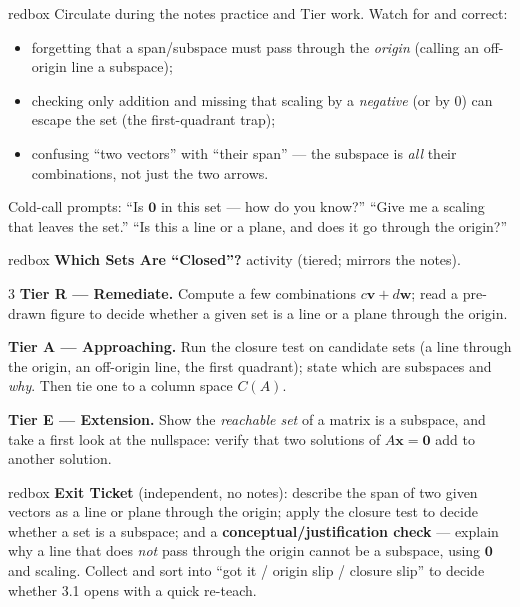 \documentclass[10pt]{article}
\newcommand{\vv}{\mathbf{v}}
\newcommand{\ww}{\mathbf{w}}
\newcommand{\zero}{\mathbf{0}}
\begin{document}
\begin{skillbox}{redbox}
Circulate during the notes practice and Tier work. Watch for and correct:
\begin{itemize}[leftmargin=1.2em, nosep]
  \item forgetting that a span/subspace must pass through the \emph{origin} (calling an off-origin
        line a subspace);
  \item checking only addition and missing that scaling by a \emph{negative} (or by $0$) can
        escape the set (the first-quadrant trap);
  \item confusing ``two vectors'' with ``their span'' --- the subspace is \emph{all} their
        combinations, not just the two arrows.
\end{itemize}
Cold-call prompts: ``Is $\zero$ in this set --- how do you know?'' ``Give me a scaling that leaves
the set.'' ``Is this a line or a plane, and does it go through the origin?''
\end{skillbox}

\begin{skillbox}{redbox}
\textbf{Which Sets Are ``Closed''?} activity (tiered; mirrors the notes).
\begin{multicols}{3}
\textbf{Tier R --- Remediate.} Compute a few combinations $c\vv+d\ww$; read a pre-drawn figure to
decide whether a given set is a line or a plane through the origin.

\columnbreak
\textbf{Tier A --- Approaching.} Run the closure test on candidate sets (a line through the
origin, an off-origin line, the first quadrant); state which are subspaces and \emph{why}. Then
tie one to a column space $C(A)$.

\columnbreak
\textbf{Tier E --- Extension.} Show the \emph{reachable set} of a matrix is a subspace, and take a
first look at the nullspace: verify that two solutions of $A\mathbf x=\zero$ add to another
solution.
\end{multicols}
\end{skillbox}

\begin{skillbox}{redbox}
\textbf{Exit Ticket} (independent, no notes): describe the span of two given vectors as a line or
plane through the origin; apply the closure test to decide whether a set is a subspace; and a
\textbf{conceptual/justification check} --- explain why a line that does \emph{not} pass through
the origin cannot be a subspace, using $\zero$ and scaling. Collect and sort into ``got it /
origin slip / closure slip'' to decide whether 3.1 opens with a quick re-teach.
\end{skillbox}
\end{document}
